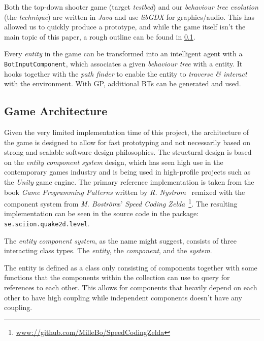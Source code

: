 \documentclass[a4paper, twocolumn]{article}
\begin{document}
        Both the top-down shooter game (target \emph{testbed}) and our \emph{behaviour tree evolution} (the \emph{technique}) are written in \emph{Java} and use \emph{libGDX} for graphics/audio. This has allowed us to quickly produce a prototype, and while the game itself isn't the main topic of this paper, a rough outline can be found in \cref{sec:game_architecture}.

        Every \emph{entity} in the game can be transformed into an intelligent agent with a \texttt{BotInputComponent}, which associates a given \emph{behaviour tree} with a entity. It hooks together with the \emph{path finder} to enable the entity to \emph{traverse \& interact} with the environment. With GP, additional BTs can be generated and used.

        \subsection{Game Architecture} \label{sec:game_architecture}

        Given the very limited implementation time of this project, the architecture of the game is designed to allow for fast prototyping and not necessarily based on strong and scalable software design philosophies. The structural design is based on the \textit{entity component system} design, which has seen high use in the contemporary games industry and is being used in high-profile projects such as the \textit{Unity} game engine. The primary reference implementation is taken from the book \textit{Game Programming Patterns} written by \textit{R. Nystrom}~\cite{nystrom2014game} remixed with the component system from \textit{M. Boström}s' \textit{Speed Coding Zelda}~\footnote{\url{www://github.com/MilleBo/SpeedCodingZelda}}. The resulting implementation can be seen in the source code in the package: \texttt{se.sciion.quake2d.level}.

        The \textit{entity component system}, as the name might suggest, consists of three interacting class types. The \textit{entity}, the \textit{component}, and the \textit{system}.

        The entity is defined as a class only consisting of components together with some functions that the components within the collection can use to query for references to each other. This allows for components that heavily depend on each other to have high coupling while independent components doesn't have any coupling.
\end{document}
